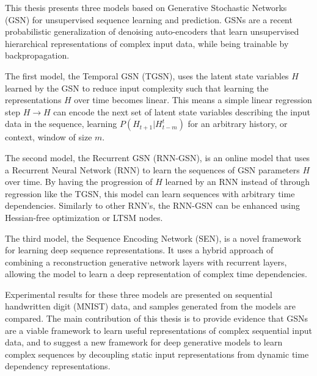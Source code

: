 This thesis presents three models based on Generative Stochastic Networks (GSN) for unsupervised sequence learning and prediction. GSNs are a recent probabilistic generalization of denoising auto-encoders that learn unsupervised hierarchical representations of complex input data, while being trainable by backpropagation.

The first model, the Temporal GSN (TGSN), uses the latent state variables \(H\) learned by the GSN to reduce input complexity such that learning the representations \(H\) over time becomes linear. This means a simple linear regression step \(H \rightarrow H\) can encode the next set of latent state variables describing the input data in the sequence, learning \(P(H_{t+1}|H_{t-m}^t)\) for an arbitrary history, or context, window of size \(m\).

The second model, the Recurrent GSN (RNN-GSN), is an online model that uses a Recurrent Neural Network (RNN) to learn the sequences of GSN parameters \(H\) over time. By having the progression of \(H\) learned by an RNN instead of through regression like the TGSN, this model can learn sequences with arbitrary time dependencies. Similarly to other RNN's, the RNN-GSN can be enhanced using Hessian-free optimization or LTSM nodes.

The third model, the Sequence Encoding Network (SEN), is a novel framework for learning deep sequence representations. It uses a hybrid approach of combining a reconstruction generative network layers with recurrent layers, allowing the model to learn a deep representation of complex time dependencies.

Experimental results for these three models are presented on sequential handwritten digit (MNIST) data, and samples generated from the models are compared. The main contribution of this thesis is to provide evidence that GSNs are a viable framework to learn useful representations of complex sequential input data, and to suggest a new framework for deep generative models to learn complex sequences by decoupling static input representations from dynamic time dependency representations.